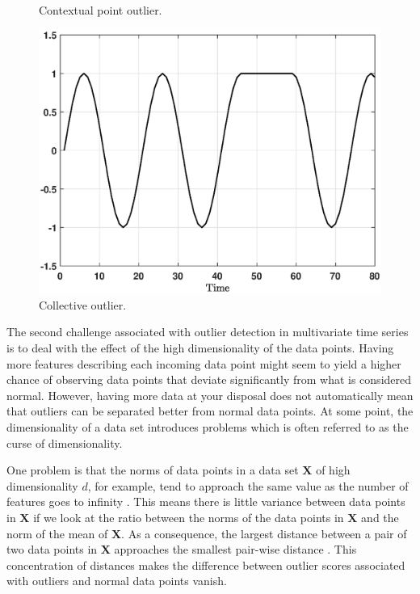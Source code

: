\begin{figure}[h]
\begin{minipage}{0.33\textwidth}
		\hspace{0.15cm}
		\caption{Contextual point outlier.}
		\label{fig:intro_contextual}
	\end{minipage}
		\vspace{-0.15cm}
	\begin{minipage}{0.33\textwidth}
		\centering
		\includegraphics[scale=0.25]{introduction/Collective_anomaly}
		\vspace{-0.5cm}
		\hspace{-0.15cm}
		\caption{Collective outlier.}
		\label{fig:intro_collective}
	\end{minipage}
		\vspace{-0.15cm}
\end{figure}

\newpage
The second challenge associated with outlier detection in multivariate time series is to deal with the effect of the high dimensionality of the data points. Having more features describing each incoming data point might seem to yield a higher chance of observing data points that deviate significantly from what is considered normal. However, having more data at your disposal does not automatically mean that outliers can be separated better from normal data points. At some point, the dimensionality of a data set introduces problems which is often referred to as the curse of dimensionality. 

One problem is that the norms of data points in a data set $\mathbf{X}$ of high dimensionality $d$, for example, tend to approach the same value as the number of features goes to infinity \cite{zimek2012survey}. This means there is little variance between data points in $\mathbf{X}$ if we look at the ratio between the norms of the data points in $\mathbf{X}$ and the norm of the mean of $\mathbf{X}$. As a consequence, the largest distance between a pair of two data points in $\mathbf{X}$ 
approaches the smallest pair-wise distance 
\cite{beyer1999nearest}. This concentration of distances makes the difference between outlier scores associated with outliers and normal data points vanish. 

